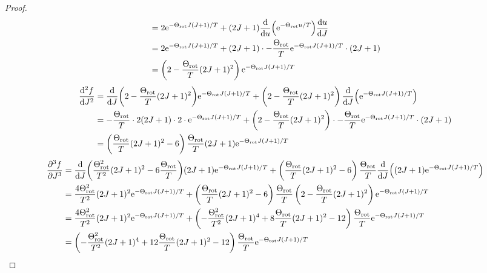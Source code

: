 \documentclass[../psets.tex]{subfiles}
\begin{document}
\begin{enumerate}
\begin{proof}
\begin{align*}
            &= 2\e[-\Theta_\text{rot}J(J+1)/T]+(2J+1)\dv{u}(\e[-\Theta_\text{rot}u/T])\dv{u}{J}\\
            &= 2\e[-\Theta_\text{rot}J(J+1)/T]+(2J+1)\cdot-\frac{\Theta_\text{rot}}{T}\e[-\Theta_\text{rot}J(J+1)/T]\cdot(2J+1)\\
            &= \left( 2-\frac{\Theta_\text{rot}}{T}(2J+1)^2 \right)\e[-\Theta_\text{rot}J(J+1)/T]
        \end{align*}
        \begin{align*}
            \dv[2]{f}{J} &= \dv{J}(2-\frac{\Theta_\text{rot}}{T}(2J+1)^2)\e[-\Theta_\text{rot}J(J+1)/T]+\left( 2-\frac{\Theta_\text{rot}}{T}(2J+1)^2 \right)\dv{J}(\e[-\Theta_\text{rot}J(J+1)/T])\\
            &= -\frac{\Theta_\text{rot}}{T}\cdot 2(2J+1)\cdot 2\cdot\e[-\Theta_\text{rot}J(J+1)/T]+\left( 2-\frac{\Theta_\text{rot}}{T}(2J+1)^2 \right)\cdot-\frac{\Theta_\text{rot}}{T}\e[-\Theta_\text{rot}J(J+1)/T]\cdot(2J+1)\\
            &= \left( \frac{\Theta_\text{rot}}{T}(2J+1)^2-6 \right)\frac{\Theta_\text{rot}}{T}(2J+1)\e[-\Theta_\text{rot}J(J+1)/T]
        \end{align*}
        \begin{align*}
            \pdv[3]{f}{J} &= \dv{J}(\frac{\Theta_\text{rot}^2}{T^2}(2J+1)^2-6\frac{\Theta_\text{rot}}{T})(2J+1)\e[-\Theta_\text{rot}J(J+1)/T]+\left( \frac{\Theta_\text{rot}}{T}(2J+1)^2-6 \right)\frac{\Theta_\text{rot}}{T}\dv{J}((2J+1)\e[-\Theta_\text{rot}J(J+1)/T])\\
            &= \frac{4\Theta_\text{rot}^2}{T^2}(2J+1)^2\e[-\Theta_\text{rot}J(J+1)/T]+\left( \frac{\Theta_\text{rot}}{T}(2J+1)^2-6 \right)\frac{\Theta_\text{rot}}{T}\left( 2-\frac{\Theta_\text{rot}}{T}(2J+1)^2 \right)\e[-\Theta_\text{rot}J(J+1)/T]\\
            &= \frac{4\Theta_\text{rot}^2}{T^2}(2J+1)^2\e[-\Theta_\text{rot}J(J+1)/T]+\left( -\frac{\Theta_\text{rot}^2}{T^2}(2J+1)^4+8\frac{\Theta_\text{rot}}{T}(2J+1)^2-12 \right)\frac{\Theta_\text{rot}}{T}\e[-\Theta_\text{rot}J(J+1)/T]\\
            &= \left( -\frac{\Theta_\text{rot}^2}{T^2}(2J+1)^4+12\frac{\Theta_\text{rot}}{T}(2J+1)^2-12 \right)\frac{\Theta_\text{rot}}{T}\e[-\Theta_\text{rot}J(J+1)/T]

\end{align*}
\end{proof}
\end{enumerate}
\end{document}
